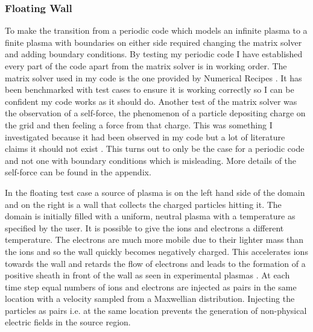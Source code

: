 \documentclass[12pt]{article}
\begin{document}
\subsubsection{Floating Wall} 
To make the transition from a periodic code which models an infinite plasma to a finite plasma with boundaries on either side required changing the matrix solver and adding boundary conditions. By testing my periodic code I have established every part of the code apart from the matrix solver is in working order. The matrix solver used in my code is the one provided by Numerical Recipes \cite{NumericalRecipes}. It has been benchmarked with test cases to ensure it is working correctly so I can be confident my code works as it should do. Another test of the matrix solver was the observation of a self-force, the phenomenon of a particle depositing charge on the grid and then feeling a force from that charge. This was something I investigated because it had been observed in my code but a lot of literature claims it should not exist \cite{bible} \cite{Hockney1981}. This turns out to only be the case for a periodic code and not one with boundary conditions which is misleading. More details of the self-force can be found in the appendix. 


In the floating test case a source of plasma is on the left hand side of the domain and on the right is a wall that collects the charged particles hitting it. The domain is initially filled with a uniform, neutral plasma with a temperature as specified by the user. It is possible to give the ions and electrons a different temperature. The electrons are much more mobile due to their lighter mass than the ions and so the wall quickly becomes negatively charged. This accelerates ions towards the wall and retards the flow of electrons and leads to the formation of a positive sheath in front of the wall as seen in experimental plasmas \cite{sheathformation}. At each time step equal numbers of ions and electrons are injected as pairs in the same location with a velocity sampled from a Maxwellian distribution. Injecting the particles as pairs i.e. at the same location prevents the generation of non-physical electric fields in the source region.  
\end{document}
